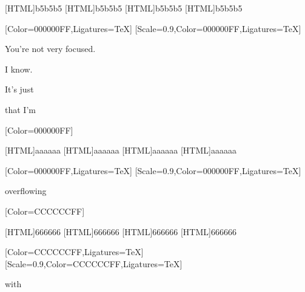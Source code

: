 [HTML]{b5b5b5}
[HTML]{b5b5b5}
[HTML]{b5b5b5}
[HTML]{b5b5b5}
\begin{paracol}{2}
  \begin{leftcolumn}
[Color=000000FF,Ligatures=TeX]
\renewfontfamily{}[Scale=0.9,Color=000000FF,Ligatures=TeX]

\begin{ally}
You're not very focused.
\end{ally}
I know.

\vfill

\noindent It's just

\vfill

\noindent that I'm
\vfill
\newpage
\end{leftcolumn}
\end{paracol}


\renewfontfamily{}[Color=000000FF]

[HTML]{aaaaaa}
[HTML]{aaaaaa}
[HTML]{aaaaaa}
[HTML]{aaaaaa}
\begin{paracol}{2}
[Color=000000FF,Ligatures=TeX]
\renewfontfamily{}[Scale=0.9,Color=000000FF,Ligatures=TeX]
\null
\vfill
\begin{center}
  overflowing
\end{center}
\vfill
\newpage
\end{paracol}

\renewfontfamily{}[Color=CCCCCCFF]

[HTML]{666666}
[HTML]{666666}
[HTML]{666666}
[HTML]{666666}
\begin{paracol}{2}
[Color=CCCCCCFF,Ligatures=TeX]
\renewfontfamily{}[Scale=0.9,Color=CCCCCCFF,Ligatures=TeX]
\null
\vfill
\begin{center}
    with
\end{center}
\vfill
\newpage
\end{paracol}

